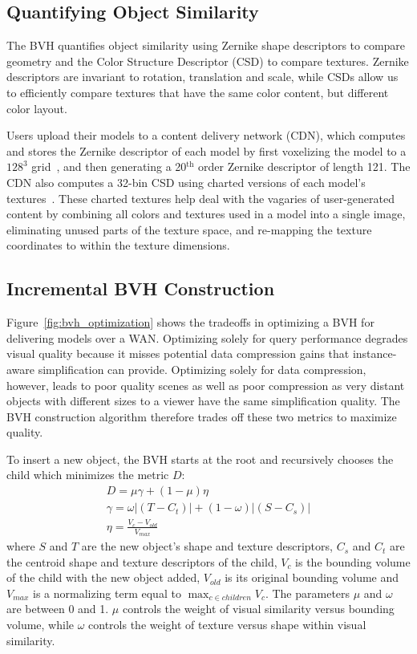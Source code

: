 \subsection{Quantifying Object Similarity}
\label{sec:similarity}

The BVH quantifies object similarity using Zernike shape descriptors
\cite{zernike} to compare geometry and the Color Structure Descriptor
(CSD) \cite{csd} to compare textures. Zernike descriptors are
invariant to rotation, translation and scale, while CSDs allow us to
efficiently compare textures that have the same color content, but
different color layout.

Users upload their models to a content delivery network (CDN),
which computes and stores the
Zernike descriptor of each model by first voxelizing the
model to a $128^{3}$ grid~\cite{binvox_1,binvox_2}, and then
generating a 20$^{\text{th}}$ order Zernike descriptor of length 121.
The CDN also computes a 32-bin CSD using charted versions of each model's
textures~\cite{icme-sirikata-paper}. These charted textures help deal with the
vagaries of user-generated content by combining
all colors and textures used in a model into a single image, eliminating
unused parts of the texture space, and re-mapping the texture coordinates
to within the texture dimensions. 

\subsection{Incremental BVH Construction}
\label{sec:bvh_incremental}

Figure~\ref{fig:bvh_optimization} shows the tradeoffs in optimizing a
BVH for delivering models over a WAN.  Optimizing solely
for query performance degrades visual quality because it misses
potential data compression gains that instance-aware simplification
can provide.  Optimizing solely for data compression, however, leads
to poor quality scenes as well as poor compression as very distant
objects with different sizes to a viewer have the same simplification
quality. The BVH construction algorithm therefore trades off these two
metrics to maximize quality.

To insert a new object, the BVH starts at the root and recursively
chooses the child which minimizes the metric $D$:
\begin{eqnarray}
\label{eq:bvh_equation}
D = \mu\gamma + (1-\mu)\eta  \\
\gamma = \omega|(T-C_t)| + (1-\omega)|(S-C_s)| \\
\eta = \frac{V_{c}-V_{old}}{V_{max}}
\end{eqnarray} %
where $S$ and $T$ are the new object's shape and texture descriptors,
$C_s$ and $C_t$ are the centroid shape and texture descriptors of the
child, $V_{c}$ is the bounding volume of the child with the new object
added, $V_{old}$ is its original bounding volume and $V_{max}$ is a
normalizing term equal to $\max_{c \in children}{V_{c}}$. The
parameters $\mu$ and $\omega$ are between 0 and 1. $\mu$
controls the weight of visual similarity versus bounding volume, while
$\omega$ controls the weight of texture versus shape within visual
similarity.

